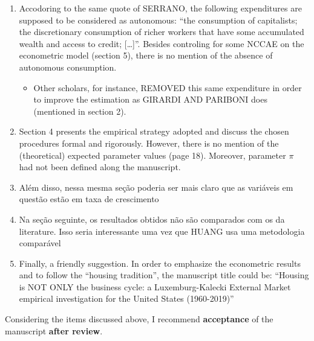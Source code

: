 \documentclass[11pt]{article}
\begin{document}
\begin{enumerate}
\item Accodoring to the same quote  of SERRANO, the following expenditures are supposed to be considered as autonomous: ``the consumption of capitalists; the discretionary consumption of richer workers that have some accumulated wealth and access to credit; [\ldots{}]''. Besides controling for some  NCCAE on the econometric model (section 5), there is no mention of the absence of autonomous consumption.

\begin{itemize}
\item Other scholars, for instance, REMOVED this same expenditure in order to improve the estimation as GIRARDI AND PARIBONI does (mentioned in section 2).
\end{itemize}

\item Section 4 presents the empirical strategy adopted and discuss the chosen procedures formal and rigorously.  However, there is no mention of the (theoretical) expected parameter values (page 18). Moreover, parameter \(\pi\) had not been defined along the manuscript.

\item Além disso, nessa mesma seção poderia ser mais claro que as variáveis em questão estão em taxa de crescimento

\item Na seção seguinte, os resultados obtidos não são comparados com os da literature. Isso seria interessante uma vez que HUANG usa uma metodologia comparável

\item Finally, a friendly suggestion. In order to emphasize the econometric results and to follow the ``housing tradition'', the manuscript title could be: ``Housing is NOT ONLY the business cycle: a Luxemburg-Kalecki External Market empirical investigation for the United States (1960-2019)''
\end{enumerate}




Considering the items discussed above, I recommend \textbf{acceptance} of the manuscript \textbf{after review}.
\end{document}
